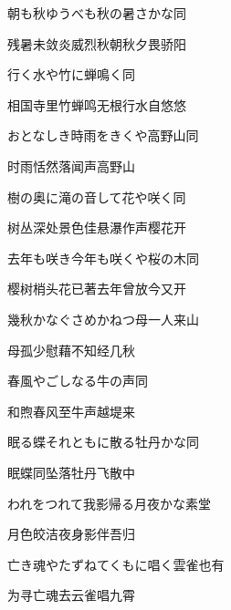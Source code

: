 \begin{haiku}
    {\FH 朝も秋ゆうべも秋の暑さかな}\hfill{\FH 同}

    {\FK 残暑未敛炎威烈秋朝秋夕畏骄阳}
\end{haiku}

\begin{haiku}
    {\FH 行く水や竹に蝉鳴く}\hfill{\FH 同}

    {\FK 相国寺里竹蝉鸣无根行水自悠悠}
\end{haiku}

\begin{haiku}
    {\FH おとなしき時雨をきくや高野山}\hfill{\FH 同}

    {\FK 时雨恬然落闻声高野山}
\end{haiku}

\begin{haiku}
    {\FH 樹の奥に滝の音して花や咲く}\hfill{\FH 同}

    {\FK 树丛深处景色佳悬瀑作声樱花开}
\end{haiku}

\begin{haiku}
    {\FH 去年も咲き今年も咲くや桜の木}\hfill{\FH 同}

    {\FK 樱树梢头花已著去年曾放今又开}
\end{haiku}

\begin{haiku}
    {\FH 幾秋かなぐさめかねつ母一人}\hfill{\FH 来山}

    {\FK 母孤少慰藉不知经几秋}
\end{haiku}

\begin{haiku}
    {\FH 春風やごしなる牛の声}\hfill{\FH 同}

    {\FK 和煦春风至牛声越堤来}
\end{haiku}

\begin{haiku}
    {\FH 眠る蝶それともに散る牡丹かな}\hfill{\FH 同}

    {\FK 眠蝶同坠落牡丹飞散中}
\end{haiku}

\begin{haiku}
    {\FH われをつれて我影帰る月夜かな}\hfill{\FH 素堂}

    {\FK 月色皎洁夜身影伴吾归}
\end{haiku}

\begin{haiku}
    {\FH 亡き魂やたずねてくもに唱く雲雀}\hfill{\FH 也有}

    {\FK 为寻亡魂去云雀唱九霄}
\end{haiku}

